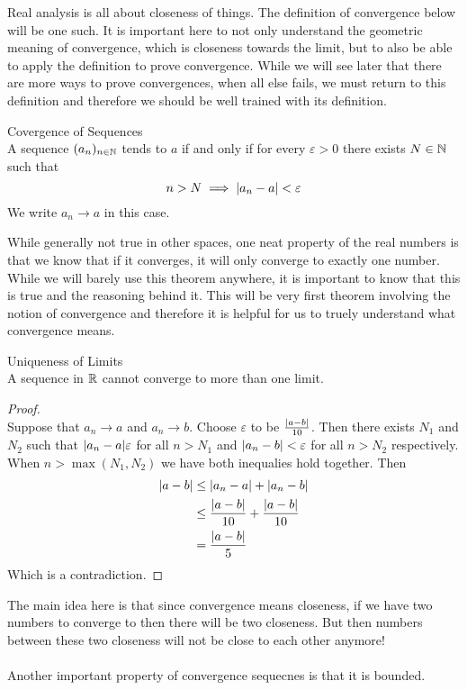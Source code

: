 \documentclass[a4paper]{article}
\begin{document}
Real analysis is all about closeness of things. The definition of convergence below will be one such. It is important here to not only understand the geometric meaning of convergence, which is closeness towards the limit, but to also be able to apply the definition to prove convergence. While we will see later that there are more ways to prove convergences, when all else fails, we must return to this definition and therefore we should be well trained with its definition. 

\begin{defn}{Covergence of Sequences}{}\\ A sequence $(a_n)_{n\in\mathbb{N}}$ tends to $a$ if and only if for every $\varepsilon>0$ there exists $N\in\mathbb{N}$ such that $$n>N\implies \abs{a_n-a}<\varepsilon$$
We write $a_n\to a$ in this case. 
\end{defn}

While generally not true in other spaces, one neat property of the real numbers is that we know that if it converges, it will only converge to exactly one number. While we will barely use this theorem anywhere, it is important to know that this is true and the reasoning behind it. This will be very first theorem involving the notion of convergence and therefore it is helpful for us to truely understand what convergence means. 

\begin{prp}{Uniqueness of Limits}{}\\ A sequence in $\mathbb{R}$ cannot converge to more than one limit. 
\begin{proof}\\ Suppose that $a_n\to a$ and $a_n\to b$. Choose $\varepsilon$ to be $\frac{\abs{a-b}}{10}$. Then there exists $N_1$ and $N_2$ such that $\abs{a_n-a}\varepsilon$ for all $n>N_1$ and $\abs{a_n-b}<\varepsilon$ for all $n>N_2$ respectively. When $n>\max{(N_1,N_2)}$ we have both inequalies hold together. Then 
\begin{align*}
\abs{a-b}&\leq\abs{a_n-a}+\abs{a_n-b}\\
&\leq \frac{\abs{a-b}}{10}+\frac{\abs{a-b}}{10}\\
&=\frac{\abs{a-b}}{5}
\end{align*}
Which is a contradiction. 
\end{proof}
\end{prp}

The main idea here is that since convergence means closeness, if we have two numbers to converge to then there will be two closeness. But then numbers between these two closeness will not be close to each other anymore! \\~\\
Another important property of convergence sequecnes is that it is bounded. 
\end{document}
